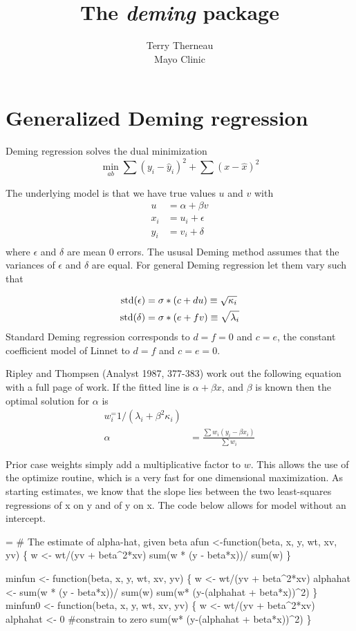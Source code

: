 \documentclass{article}
\title{The \emph{deming} package}
\author{Terry Therneau \\ Mayo Clinic}
\begin{document}
\section{Generalized Deming regression}
Deming regression solves the dual minimization
\begin{equation*}
  \min_{ab} \sum (y_i- \hat y_i)^2 + \sum (x - \hat x)^2
\end{equation*}

The underlying model is that we have true values $u$ and $v$ with
\begin{align*}
  u &= \alpha + \beta v \\
  x_i &= u_i + \epsilon \\
  y_i &= v_i + \delta \\
\end{align*}
where $\epsilon$ and $\delta$ are mean 0 errors.
The ususal Deming method assumes that the variances of 
$\epsilon$ and $\delta$ are equal.
For general Deming regression let them vary such that

\begin{align*}
  {\rm std}(\epsilon) &= \sigma *(c + du) \equiv \sqrt{\kappa_i} \\
  {\rm std}(\delta) &= \sigma *(e + fv) \equiv \sqrt{\lambda_i} \\
\end{align*}
Standard Deming regression corresponds to $d=f=0$ and $c=e$,
the constant coefficient model of Linnet to $d=f$ and $c=e=0$.

Ripley and Thompsen (Analyst 1987, 377-383) work out the 
following equation with a full page of work.
If the fitted line is $\alpha + \beta x$, and $\beta$ is known
then the optimal solution for $\alpha$ is
\begin{align*}
  w_i ^= 1/(\lambda_i + \beta^2 \kappa_i) \\
  \alpha &= \frac{\sum w_i(y_i -\beta x_i)}{\sum w_i} 
\end{align*}

Prior case weights simply add a multiplicative factor to $w$.
This allows the use of the optimize routine, which is a very fast for one
dimensional maximization.  As starting estimates, we know that the slope
lies between the two least-squares regressions of x on y and of y on x.
The code below allows for model without an intercept.

\begin{nwchunk}
=
 # The estimate of alpha-hat, given beta
 afun <-function(beta, x, y, wt, xv, yv) \{
     w <- wt/(yv + beta^2*xv)
     sum(w * (y - beta*x))/ sum(w)
 \}
 
 minfun <- function(beta, x, y, wt, xv, yv) \{
     w <-  wt/(yv + beta^2*xv)
     alphahat <- sum(w * (y - beta*x))/ sum(w)
     sum(w* (y-(alphahat + beta*x))^2)
 \}
 minfun0 <- function(beta, x, y, wt, xv, yv) \{
     w <-  wt/(yv + beta^2*xv)
     alphahat <- 0  #constrain to zero
     sum(w* (y-(alphahat + beta*x))^2)
 \}
\end{nwchunk}
\end{document}
